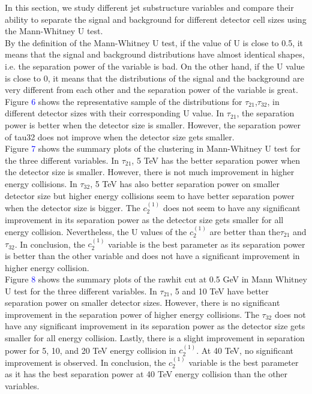 In this section, we study different jet substructure variables and compare their ability to separate the signal and background for different detector cell sizes using the Mann-Whitney U test.\\

By the definition of the Mann-Whitney U test, if the value of U is close to 0.5, it means that the signal and background distributions have almost identical shapes, i.e. the separation power of the variable is bad. On the other hand, if the U value is close to 0, it means that the distributions of the signal and the background are very different from each other and the separation power of the variable is great.\\
 
Figure \textcolor{blue}{6} shows the representative sample of the distributions for $\tau_{21}$,$\tau_{32}$, in different detector sizes with their corresponding U value. In $\tau_{21}$, the separation power is better when the detector size is smaller. However, the separation power of tau32 does not improve when the detector size gets smaller.\\

Figure \textcolor{blue}{7} shows the summary plots of the clustering in Mann-Whitney U test for the three different variables.  In $\tau_{21}$, 5 TeV has the better separation power when the detector size is smaller. However, there is not much improvement in higher energy collisions. In $\tau_{32}$, 5 TeV has also better separation power on smaller detector size but higher energy collisions seem to have better separation power when the detector size is bigger. The $c_2^{(1)}$ does not seem to have any significant improvement in its separation power as the detector size gets smaller for all energy collision. Nevertheless, the U values of the $c_2^{(1)}$ are better than the$\tau_{21}$ and $\tau_{32}$. In conclusion, the $c_2^{(1)}$ variable is the best parameter as its separation power is better than the other variable and does not have a significant improvement in higher energy collision.\\

Figure \textcolor{blue}{8} shows the summary plots of the rawhit cut at 0.5 GeV in Mann Whitney U test for the three different variables. In $\tau_{21}$, 5 and 10 TeV have better separation power on smaller detector sizes. However, there is no significant improvement in the separation power of higher energy collisions. The $\tau_{32}$ does not have any significant improvement in its separation power as the detector size gets smaller for all energy collision. Lastly, there is a slight improvement in separation power for 5, 10, and 20 TeV energy collision in $c_2^{(1)}$. At 40 TeV, no significant improvement is observed. In conclusion, the $c_2^{(1)}$ variable is the best parameter as it has the best separation power at 40 TeV energy collision than the other variables.\\

